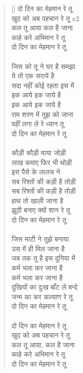 \begin{verse}[\versewidth]\texthindi{ 
दो दिन का मेहमान रे तू\\
खुद को अब पहचान रे तू x2\\
कल तू आया कल है जाना\\
काहे करे अभिमान रे तू\\
दो दिन का मेहमान रे तू\\
\\
जिस को तू ने घर है समझा\\
ये तो एक सराये है\\
सदा नहीं कोई रहता इस में\\
इक आये इक जाये है\\
इक आये इक जाये है\\
राम शरण में तुझ को जाना\\
वहीं लगा ले रे ध्यान तू\\
दो दिन का मेहमान रे तू\\
\\
कौड़ी कौड़ी माया जोड़ी\\
लाख कमाए फिर भी थोड़ी\\
इस पैसे के लालच ने\\
सब रिश्तों की कड़ी है तोड़ी\\
सब रिश्तों की कड़ी है तोड़ी\\
हाथ तो खाली जाना है\\
झूठी बनाए क्यों शान रे तू\\
दो दिन का मेहमान रे तू\\
\\
जिस माटी ने तुझे बनाया\\
उस में ही मिल जाना है\\
जब तक तू है इस दुनिया में\\
कर्म भला कर जाना है\\
कर्म भला कर जाना है\\
दुखियों का दुःख बाँट ले बन्दे\\
जन्म का कर कल्याण रे तू\\
दो दिन का मेहमान रे तू\\
\\
दो दिन का मेहमान रे तू\\
खुद को अब पहचान रे तू\\
कल तू आया, कल है जाना\\
काहे करे अभिमान रे तू\\
दो दिन का मेहमान रे तू
}
\end{verse}

